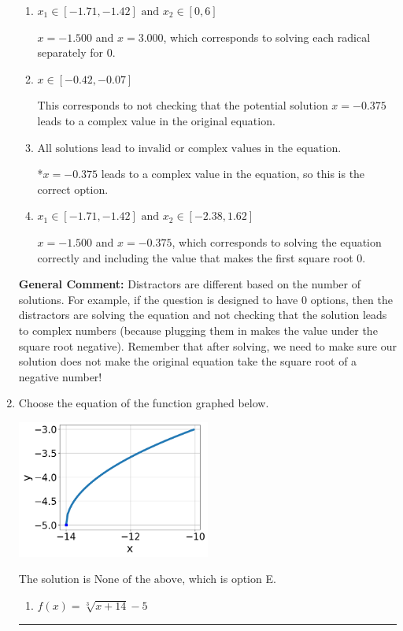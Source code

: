 \documentclass{extbook}[14pt]
\newcommand{\litem}[1]{\item #1

\rule{\textwidth}{0.4pt}}
\begin{document}
\begin{enumerate}
{\begin{enumerate}[label=\Alph*.]
$x = -1.875$, which corresponds to squaring each square root separately and assigning the negative to the third term.
\item \( x_1 \in [-1.71, -1.42] \text{ and } x_2 \in [0,6] \)

$x = -1.500$ and $x = 3.000$, which corresponds to solving each radical separately for 0.
\item \( x \in [-0.42,-0.07] \)

This corresponds to not checking that the potential solution $x = -0.375$ leads to a complex value in the original equation.
\item \( \text{All solutions lead to invalid or complex values in the equation.} \)

*$x = -0.375$ leads to a complex value in the equation, so this is the correct option.
\item \( x_1 \in [-1.71, -1.42] \text{ and } x_2 \in [-2.38,1.62] \)

$x = -1.500$ and $x = -0.375$, which corresponds to solving the equation correctly and including the value that makes the first square root 0.
\end{enumerate}

\textbf{General Comment:} Distractors are different based on the number of solutions. For example, if the question is designed to have 0 options, then the distractors are solving the equation and not checking that the solution leads to complex numbers (because plugging them in makes the value under the square root negative). Remember that after solving, we need to make sure our solution does not make the original equation take the square root of a negative number!
}
\litem{
Choose the equation of the function graphed below.

\begin{center}
    \includegraphics[width=0.5\textwidth]{../Figures/radicalGraphToEquationCopyB.png}
\end{center}




The solution is \( \text{None of the above} \), which is option E.\begin{enumerate}[label=\Alph*.]
\item \( f(x) = \sqrt[3]{x + 14} - 5 \)


\end{enumerate}}
\end{enumerate}
\end{document}
